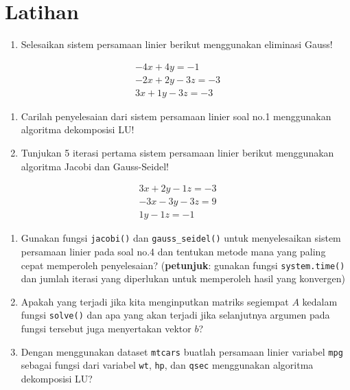 \documentclass[
]{book}
\providecommand{\tightlist}{%
  \setlength{\itemsep}{0pt}\setlength{\parskip}{0pt}}
\theoremstyle{definition}
\theoremstyle{definition}
\theoremstyle{definition}
\theoremstyle{definition}
\theoremstyle{remark}
\begin{document}
\hypertarget{latihan}{%
\section{Latihan}\label{latihan}}

\begin{enumerate}
\def\labelenumi{\arabic{enumi}.}
\tightlist
\item
  Selesaikan sistem persamaan linier berikut menggunakan eliminasi Gauss!
\end{enumerate}

\[
\begin{matrix}
  -4x+4y=-1 \\
  -2x+2y-3z=-3 \\
  3x+1y-3z=-3
\end{matrix}
\]

\begin{enumerate}
\def\labelenumi{\arabic{enumi}.}
\setcounter{enumi}{1}
\tightlist
\item
  Carilah penyelesaian dari sistem persamaan linier soal no.1 menggunakan algoritma dekomposisi LU!
\item
  Tunjukan 5 iterasi pertama sistem persamaan linier berikut menggunakan algoritma Jacobi dan Gauss-Seidel!
\end{enumerate}

\[
\begin{matrix}
  3x+2y-1z=-3 \\
  -3x-3y-3z=9 \\
  1y-1z=-1
\end{matrix}
\]

\begin{enumerate}
\def\labelenumi{\arabic{enumi}.}
\setcounter{enumi}{3}
\tightlist
\item
  Gunakan fungsi \texttt{jacobi()} dan \texttt{gauss\_seidel()} untuk menyelesaikan sistem persamaan linier pada soal no.4 dan tentukan metode mana yang paling cepat memperoleh penyelesaian? (\textbf{petunjuk}: gunakan fungsi \texttt{system.time()} dan jumlah iterasi yang diperlukan untuk memperoleh hasil yang konvergen)
\item
  Apakah yang terjadi jika kita menginputkan matriks segiempat \(A\) kedalam fungsi \texttt{solve()} dan apa yang akan terjadi jika selanjutnya argumen pada fungsi tersebut juga menyertakan vektor \(b\)?
\item
  Dengan menggunakan dataset \texttt{mtcars} buatlah persamaan linier variabel \texttt{mpg} sebagai fungsi dari variabel \texttt{wt}, \texttt{hp}, dan \texttt{qsec} menggunakan algoritma dekomposisi LU?
\end{enumerate}
\end{document}
